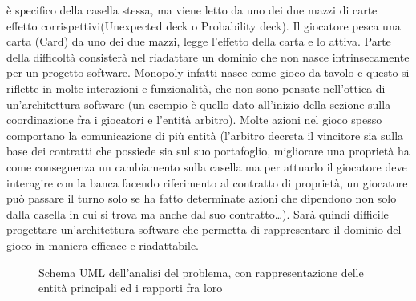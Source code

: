 è specifico della casella stessa, ma viene letto da uno dei due mazzi di carte effetto corrispettivi(Unexpected deck o Probability deck). 
Il giocatore pesca una carta (Card) da uno dei due mazzi, legge l'effetto della carta e lo attiva. \newline
Parte della difficoltà consisterà nel riadattare un dominio che non nasce intrinsecamente per un progetto software.
Monopoly infatti nasce come gioco da tavolo e questo si riflette in molte interazioni e funzionalità, che non sono pensate 
nell'ottica di un'architettura software (un esempio è quello dato all'inizio della sezione sulla coordinazione fra i giocatori e 
l'entità arbitro). Molte azioni nel gioco spesso comportano la comunicazione di più entità (l'arbitro decreta il vincitore sia sulla base dei 
contratti che possiede sia sul suo portafoglio, migliorare una
proprietà ha come conseguenza un cambiamento sulla casella ma per attuarlo il giocatore deve interagire con la banca facendo riferimento
al contratto di proprietà, un giocatore può passare il turno solo se ha fatto determinate azioni che dipendono non solo dalla casella in cui
si trova ma anche dal suo contratto\dots). 
Sarà quindi difficile progettare un'architettura software che permetta di rappresentare il dominio del gioco
in maniera efficace e riadattabile. 


\begin{figure}[H]
    \centering
    \caption{Schema UML dell'analisi del problema, con rappresentazione delle entità principali ed i rapporti fra loro}
	\label{img:entity_diagram}
\end{figure}
